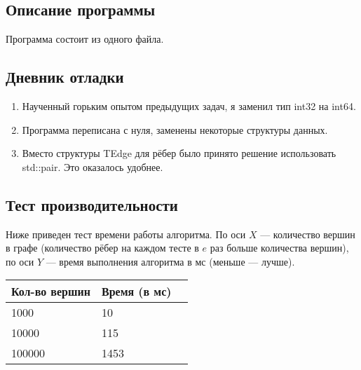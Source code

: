 \documentclass[12pt]{article}
\begin{document}
    \subsection*{Описание программы}

    Программа состоит из одного файла.

    \subsection*{Дневник отладки}

    \begin{enumerate}
    \item Наученный горьким опытом предыдущих задач, я заменил тип int32 на 
    int64.
    \item Программа переписана с нуля, заменены некоторые структуры данных.
    \item Вместо структуры TEdge для рёбер было принято решение использовать
    std::pair. Это оказалось удобнее.
    \end{enumerate}

    \subsection*{Тест производительности}

    Ниже приведен тест времени работы алгоритма. По оси $X$ — количество 
    вершин в графе (количество рёбер на каждом тесте в $e$ раз больше 
    количества вершин), по оси $Y$ — время выполнения алгоритма в мс (меньше 
    — лучше).
    

    \begin{tabular}{ | l | l | l | }
        \hline
            Кол-во вершин    & Время (в мс) \\ \hline
            1000             & 10           \\
            10000            & 115          \\
            100000           & 1453         \\
        \hline
    \end{tabular}
\end{document}
